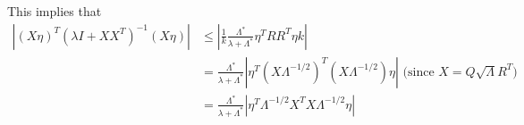\documentclass[10pt]{article}
\theoremstyle{plain}%
\theoremstyle{definition}
\newcommand{\<}{\langle}
\renewcommand{\>}{\rangle}
\renewcommand{\[}{\left[}
\renewcommand{\]}{\right]}
\renewcommand{\(}{\left(}
\renewcommand{\)}{\right)}
\begin{document}
This implies that 
\begin{align*}
\left|(X\eta)^T (\lambda I + XX^T)^{-1}(X\eta) \right|
&\leq \left|\frac{1}{k} \frac{\Lambda^*}{\lambda + \Lambda^*} \eta^T RR^T \eta k \right|\\
&= \frac{\Lambda^*}{\lambda + \Lambda^*} \left|\eta^T (X \Lambda^{-1/2})^T (X \Lambda^{-1/2}) \eta  \right| \text{ (since $X=Q\sqrt{\Lambda}R^T$)}\\
&= \frac{\Lambda^*}{\lambda + \Lambda^*} \left|\eta^T \Lambda^{-1/2} X^TX \Lambda^{-1/2} \eta \right| 
\end{align*}
\end{document}
